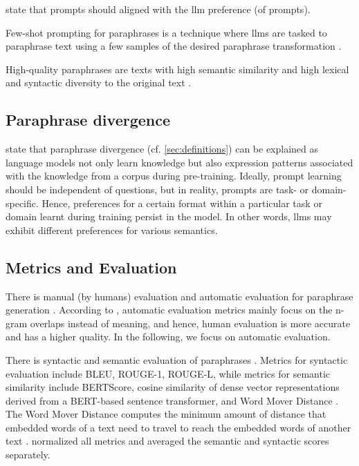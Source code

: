 \citet{zhou_paraphrase_2025} state that prompts should aligned with the \ac{llm} preference (of prompts).

Few-shot prompting for paraphrases is a technique where \acp{llm} are tasked to paraphrase text using a few samples of the desired paraphrase transformation \cite{zhou_paraphrase_2025}.

High-quality paraphrases are texts with high semantic similarity and high lexical and syntactic diversity to the original text \cite{gohsen_captions_2023}.


\subsection{Paraphrase divergence}
\citet{fu_learning_2024} state that paraphrase divergence (cf. \autoref{sec:definitions}) can be explained as language models 
not only learn knowledge but also expression patterns associated with the knowledge from a corpus during pre-training.
Ideally, prompt learning should be independent of questions, but in reality, prompts are task- or domain-specific.
Hence, preferences for a certain format within a particular task or domain learnt during training persist in the model.
In other words, \acp{llm} may exhibit different preferences for various semantics.


\subsection{Metrics and Evaluation}
There is manual (by humans) evaluation and automatic evaluation for paraphrase generation \cite{fu_learning_2024,zhou_paraphrase_2021}.
According to \citet{zhou_paraphrase_2021}, automatic evaluation metrics mainly focus on the n-gram overlaps instead of meaning, 
and hence, human evaluation is more accurate and has a higher quality.
In the following, we focus on automatic evaluation.

There is syntactic and semantic evaluation of paraphrases \cite{gohsen_captions_2023}.
Metrics for syntactic evaluation include BLEU, ROUGE-1, ROUGE-L, 
while metrics for semantic similarity include BERTScore, 
cosine similarity of dense vector representations derived from a BERT-based sentence transformer, 
and Word Mover Distance \cite{gohsen_captions_2023}.
The Word Mover Distance computes the minimum amount of distance that embedded words of a text need to travel 
to reach the embedded words of another text \cite{gohsen_captions_2023}.
\citet{gohsen_captions_2023} normalized all metrics and averaged the semantic and syntactic scores separately.


